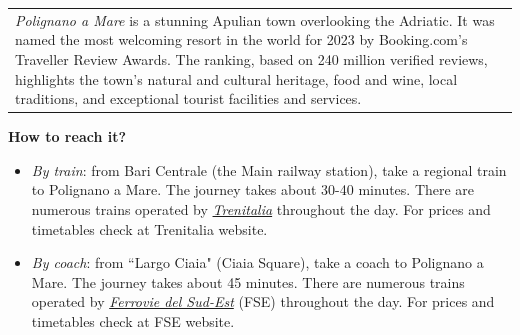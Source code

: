 \documentclass[
	openany, %
	parskip=full, %
	12pt, %
	a4paper, %
]{conferencebooklet} %
\newcommand\smallbull{\scaleobj{0.7}{\blacksquare}}
\newcommand\itema{\item[\textcolor{case_blue}{$\smallbull$}]}
\begin{document}
\begin{adjustwidth}{10pt}{20pt}
\begin{table}[h!]
{\begin{tabular}{p{90mm}}
            \vspace{1mm}
            \textit{Polignano a Mare} is a stunning Apulian town overlooking the Adriatic. It was named the most welcoming resort in the world for 2023 by Booking.com’s Traveller Review Awards. The ranking, based on 240 million verified reviews, highlights the town's natural and cultural heritage, food and wine, local traditions, and exceptional tourist facilities and services.
        \end{tabular}
            }
\end{table}
\vspace{-3mm}
\textbf{How to reach it?}
\vspace{-5mm}
\begin{itemize}[leftmargin=*, noitemsep] 
        \itema \textit{By train}: from Bari Centrale (the Main railway station), take a regional train to Polignano a Mare. The journey takes about 30-40 minutes. There are numerous trains operated by \color{blue}\href{https://www.trenitalia.com/en.html}{\textit{Trenitalia}} \color{black} throughout the day. For prices and timetables check at Trenitalia website.
        \itema  \textit{By coach}: from ``Largo Ciaia" (Ciaia Square), take a coach to Polignano a Mare. The journey takes about 45 minutes. There are numerous trains operated by \color{blue}\href{https://www.fseonline.it/s/?language=it}{\textit{Ferrovie del Sud-Est}} \color{black} (FSE) throughout the day. For prices and timetables check at FSE website.
\end{itemize}
\end{adjustwidth}
\end{document}
